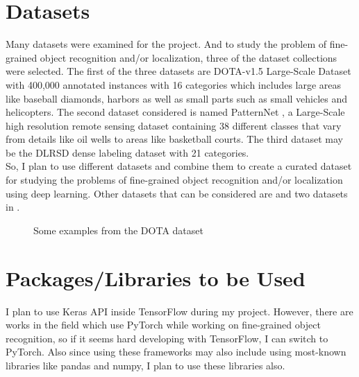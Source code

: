 \documentclass[10pt,journal,onecolumn]{IEEEtran}
\begin{document}
\section{Datasets}
Many datasets were examined for the project. And to study the problem of fine-grained object recognition and/or localization, three of the dataset collections were selected. The first of the three datasets are DOTA-v1.5 Large-Scale Dataset \cite{xia2018dota} with 400,000 annotated instances with 16 categories which includes large areas like baseball diamonds, harbors as well as small parts such as small vehicles and helicopters. The second dataset considered is named PatternNet \cite{zhou2018patternnet}, a Large-Scale high resolution remote sensing dataset containing 38 different classes that vary from details like oil wells to areas like basketball courts. The third dataset may be the DLRSD \cite{chaudhuri2018multilabel} dense labeling dataset with 21 categories. \\
\indent So, I plan to use different datasets and combine them to create a curated dataset for studying the problems of fine-grained object recognition and/or localization using deep learning. Other datasets that can be considered are \cite{cheng2017remote} \cite{cheng2014multi} \cite{cheng2016survey} \cite{cheng2016learning} and two datasets in \cite{li2017rsi}.


\begin{figure}[ht]
  \centering
  \subfigure[Roundabout]{%
    \texttt{[image: 1]}%
    \label{fig:a}%
    }\hspace{0.2cm}%
    \subfigure[Plane]{%
    \texttt{[image: 3]}%
    \label{fig:c}%
  }
  \caption{Some examples from the DOTA dataset \cite{xia2018dota} }
  \label{fig:abcd}
\end{figure}

\vspace{-5mm}
\section{Packages/Libraries to be Used}
I plan to use Keras API inside TensorFlow during my project. However, there are works in the field \cite{sumbul2019multisource}\cite{sumbul2018fine} which use PyTorch while working on fine-grained object recognition, so if it seems hard developing with TensorFlow, I can switch to PyTorch. Also since using these frameworks may also include using most-known libraries like pandas and numpy, I plan to use these libraries also.
\end{document}
